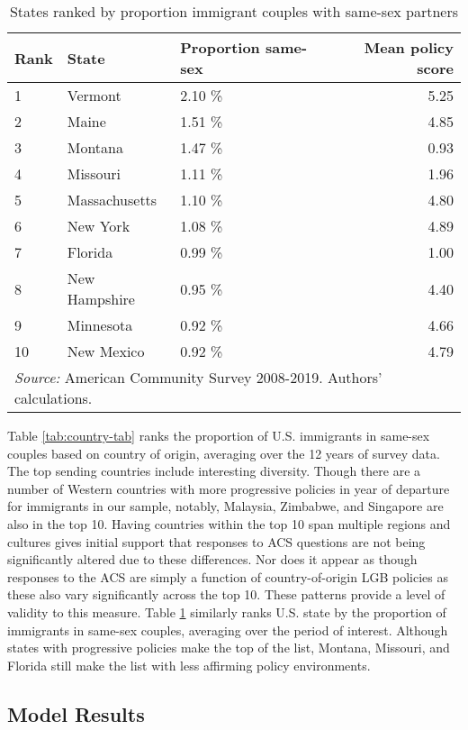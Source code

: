 \documentclass[
  11pt,
]{article}
\begin{document}
\begin{table}

\caption{\label{tab:state-tab}States ranked by proportion immigrant couples with same-sex partners}
\centering
\begin{tabular}[t]{lllr}
\toprule
Rank & State & Proportion same-sex & Mean policy score\\
\midrule
1 & Vermont & 2.10 \% & 5.25\\
2 & Maine & 1.51 \% & 4.85\\
3 & Montana & 1.47 \% & 0.93\\
4 & Missouri & 1.11 \% & 1.96\\
5 & Massachusetts & 1.10 \% & 4.80\\
6 & New York & 1.08 \% & 4.89\\
7 & Florida & 0.99 \% & 1.00\\
8 & New Hampshire & 0.95 \% & 4.40\\
9 & Minnesota & 0.92 \% & 4.66\\
10 & New Mexico & 0.92 \% & 4.79\\
\bottomrule
\multicolumn{4}{l}{\rule{0pt}{1em}\textit{Source:} American Community Survey 2008-2019. Authors' calculations.}\\
\end{tabular}
\end{table}

Table \ref{tab:country-tab} ranks the proportion of U.S. immigrants in same-sex couples based on country of origin, averaging over the 12 years of survey data. The top sending countries include interesting diversity. Though there are a number of Western countries with more progressive policies in year of departure for immigrants in our sample, notably, Malaysia, Zimbabwe, and Singapore are also in the top 10. Having countries within the top 10 span multiple regions and cultures gives initial support that responses to ACS questions are not being significantly altered due to these differences. Nor does it appear as though responses to the ACS are simply a function of country-of-origin LGB policies as these also vary significantly across the top 10. These patterns provide a level of validity to this measure. Table \ref{tab:state-tab} similarly ranks U.S. state by the proportion of immigrants in same-sex couples, averaging over the period of interest. Although states with progressive policies make the top of the list, Montana, Missouri, and Florida still make the list with less affirming policy environments.

\hypertarget{model-results}{%
\subsection{Model Results}\label{model-results}}
\end{document}

